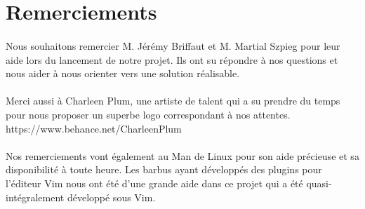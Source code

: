 \section*{Remerciements}

\paragraph{}
Nous souhaitons remercier M. Jérémy Briffaut et M. Martial Szpieg pour leur aide lors du lancement de notre projet. Ils ont su répondre à nos questions et nous aider à nous orienter vers une solution réalisable.
\paragraph{}
Merci aussi à Charleen Plum, une artiste de talent qui a su prendre du temps pour nous proposer un superbe logo correspondant à nos attentes.
\newline https://www.behance.net/CharleenPlum
\paragraph{}
Nos remerciements vont également au Man de Linux pour son aide précieuse et sa disponibilité à toute heure. Les barbus ayant développés des plugins pour l'éditeur Vim nous ont été d'une grande aide dans ce projet qui a été quasi-intégralement développé sous Vim.
